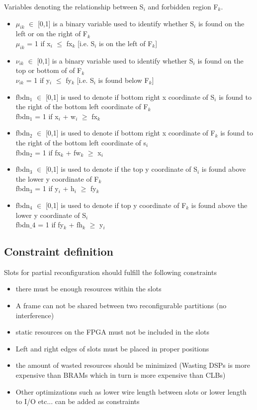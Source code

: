 \documentclass[conference]{IEEEtran}
\begin{document}
\hfill \break

Variables denoting the relationship between S$_i$ and forbidden region F$_k$.  
\begin{itemize}
\item $\mu_{ik}$ $\in$ [0,1] is a binary variable used to identify whether S$_i$ is found on the left or on the right of F$_k$\\
$\mu_{ik}$ = 1 if x$_i$ $\leq$ fx$_k$ [i.e. S$_i$ is on the left of F$_k$]

\item $\nu_{ik}$ $\in$ [0,1] is a binary variable used to identify whether S$_i$ is found on the top or bottom of of F$_k$\\
$\nu_{ik}$ = 1 if y$_i$ $\leq$ fy$_k$ [i.e. S$_i$ is found below F$_k$]

\item fbdn$_1$ $\in$ [0,1] is used to denote if bottom right x coordinate of S$_i$ is found to the right of the bottom left coordinate of F$_k$ \\
fbdn$_1$ = 1 if x$_i$ + w$_i$ $\geq$ fx$_k$

\item fbdn$_2$ $\in$ [0,1] is used to denote if bottom right x coordinate of F$_k$ is found to the right of the bottom left coordinate of s$_i$ \\
fbdn$_2$ = 1 if fx$_k$ + fw$_k$ $\geq$ x$_i$

\item fbdn$_3$ $\in$ [0,1] is used to denote if the top y coordinate of S$_i$ is found above the lower y coordinate of F$_k$ \\
fbdn$_3$ = 1 if y$_i$ + h$_i$ $\geq$ fy$_k$

\item fbdn$_4$ $\in$ [0,1] is used to denote if top y coordinate of F$_k$ is found above the lower y coordinate of S$_i$ \\
fbdn$\_4$ = 1 if fy$_k$ + fh$_k$ $\geq$ y$_i$

\end{itemize}

\subsection{Constraint definition}
Slots for partial reconfiguration should fulfill the following constraints
\begin{itemize}
\item there must be enough resources within the slots
\item A frame can not be shared between two reconfigurable partitions (no interference)
\item static resources on the FPGA must not be included in the slots 
\item Left and right edges of slots must be placed in proper positions
\item the amount of wasted resources should be minimized (Wasting DSPs is more expensive than BRAMs which in turn is more expensive than CLBs)
\item Other optimizations such as lower wire length between slots or lower length to I/O etc... can be added as constraints
\end{itemize}
\end{document}
